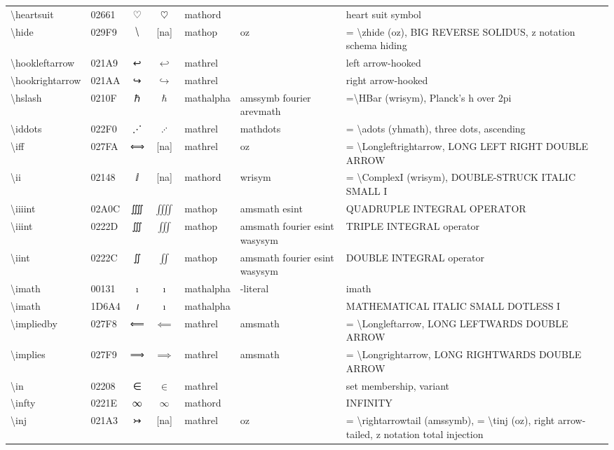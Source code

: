 \documentclass[a4paper,landscape]{article}
\begin{document}
\begin{longtable}{llcclll}
\textbackslash{}heartsuit & 02661 & ♡ & $\heartsuit$ & mathord &  & heart suit symbol \\
\textbackslash{}hide & 029F9 & ⧹ & [na] & mathop & oz & = \textbackslash{}zhide (oz),  BIG REVERSE SOLIDUS,  z notation schema hiding \\
\textbackslash{}hookleftarrow & 021A9 & ↩ & $\hookleftarrow$ & mathrel &  & left arrow-hooked \\
\textbackslash{}hookrightarrow & 021AA & ↪ & $\hookrightarrow$ & mathrel &  & right arrow-hooked \\
\textbackslash{}hslash & 0210F & ℏ & $\hslash$ & mathalpha & amssymb fourier arevmath & =\textbackslash{}HBar (wrisym), Planck's h over 2pi \\
\textbackslash{}iddots & 022F0 & ⋰ & $\iddots$ & mathrel & mathdots & = \textbackslash{}adots (yhmath), three dots, ascending \\
\textbackslash{}iff & 027FA & ⟺ & [na] & mathrel & oz & = \textbackslash{}Longleftrightarrow,  LONG LEFT RIGHT DOUBLE ARROW \\
\textbackslash{}ii & 02148 & ⅈ & [na] & mathord & wrisym & = \textbackslash{}ComplexI (wrisym),  DOUBLE-STRUCK ITALIC SMALL I \\
\textbackslash{}iiiint & 02A0C & ⨌ & $\iiiint$ & mathop & amsmath esint & QUADRUPLE INTEGRAL OPERATOR \\
\textbackslash{}iiint & 0222D & ∭ & $\iiint$ & mathop & amsmath fourier esint wasysym & TRIPLE INTEGRAL operator \\
\textbackslash{}iint & 0222C & ∬ & $\iint$ & mathop & amsmath fourier esint wasysym & DOUBLE INTEGRAL operator \\
\textbackslash{}imath & 00131 & ı & $\imath$ & mathalpha & -literal & imath \\
\textbackslash{}imath & 1D6A4 & 𝚤 & $\imath$ & mathalpha &  & MATHEMATICAL ITALIC SMALL DOTLESS I \\
\textbackslash{}impliedby & 027F8 & ⟸ & $\impliedby$ & mathrel & amsmath & = \textbackslash{}Longleftarrow,  LONG LEFTWARDS DOUBLE ARROW \\
\textbackslash{}implies & 027F9 & ⟹ & $\implies$ & mathrel & amsmath & = \textbackslash{}Longrightarrow,  LONG RIGHTWARDS DOUBLE ARROW \\
\textbackslash{}in & 02208 & ∈ & $\in$ & mathrel &  & set membership, variant \\
\textbackslash{}infty & 0221E & ∞ & $\infty$ & mathord &  & INFINITY \\
\textbackslash{}inj & 021A3 & ↣ & [na] & mathrel & oz & = \textbackslash{}rightarrowtail (amssymb), = \textbackslash{}tinj (oz),  right arrow-tailed,  z notation total injection \\

\end{longtable}
\end{document}
